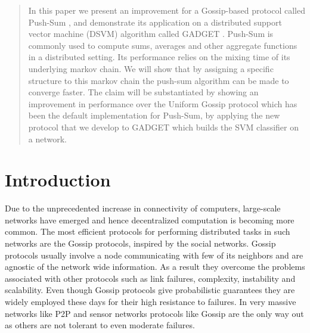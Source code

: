 \documentclass{article}
\begin{document}
 

\begin{abstract} 
In this paper we present an improvement for a Gossip-based protocol called Push-Sum \cite{Kempe03gossip-basedcomputation}, and demonstrate its application on a distributed support vector machine (DSVM) algorithm called GADGET \cite{Hensel_gadgetsvm}. Push-Sum is commonly used to compute sums, averages and other aggregate functions in a distributed setting. Its performance relies on the mixing time of its underlying markov chain. We will show that by assigning a specific structure to this markov chain the push-sum algorithm can be made to converge faster. The claim will be substantiated by showing an improvement in performance over the Uniform Gossip protocol which has been the default implementation for Push-Sum, by applying the new protocol that we develop to GADGET which builds the SVM classifier on a network.

\end{abstract} 

\section{Introduction}
\label{intro}

Due to the unprecedented increase in connectivity of computers, large-scale networks have emerged and hence decentralized computation is becoming more common. The most efficient protocols for performing distributed tasks in such networks are the Gossip protocols, inspired by the social networks. Gossip protocols usually involve a node communicating with few of its neighbors and are agnostic of the network wide information. As a result they overcome the problems associated with other protocols such as link failures, complexity, instability and scalability. Even though Gossip protocols give probabilistic guarantees they are widely employed these days for their high resistance to failures. In very massive networks like P2P and sensor networks protocols like Gossip are the only way out as others are not tolerant to even moderate failures.
 
\end{document}
